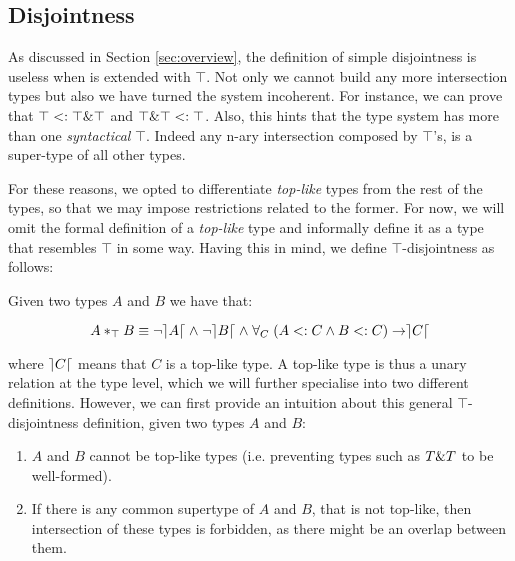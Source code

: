 
\subsection{Disjointness} 
As discussed in Section \ref{sec:overview}, the definition of
simple disjointness is useless when \name is extended with $\top$.
Not only we cannot build any more intersection types but also we have turned the system incoherent.
For instance, we can prove that $\top <: \top \& \top$ and $\top \& \top <: \top$. 
Also, this hints that the type system has more than one \emph{syntactical} $\top$.
Indeed any n-ary intersection composed by $\top$'s, is a super-type of all other
types.

For these reasons, we opted to differentiate \emph{top-like} types from the rest of the types,
so that we may impose restrictions related to the former.
For now, we will omit the formal definition of a \emph{top-like} type and informally
define it as a type that resembles $\top$ in some way. 
Having this in mind, we define $\top$-disjointness as follows:
\begin{definition}
Given two types $A$ and $B$ we have that:

\[A *_{\top} B \equiv \neg \rceil A \lceil \; \wedge \; \neg \rceil B \lceil \; \wedge \; 
\forall_C \; ( A <: C \wedge B <: C ) \rightarrow \rceil C \lceil \]

\end{definition}
\noindent where $\rceil C \lceil$ means that $C$ is a top-like type.
A top-like type is thus a unary relation at the type level, which we will further specialise into two different definitions. 
However, we can first provide an intuition about this general $\top$-disjointness definition, given two
types $A$ and $B$:
\begin{enumerate}
\item $A$ and $B$ cannot be top-like types (i.e. preventing types such as $T \& T$ to be well-formed).
\item If there is any common supertype of $A$ and $B$, that is not top-like, then 
intersection of these types is forbidden, as there might be an overlap between them. 
\end{enumerate}

